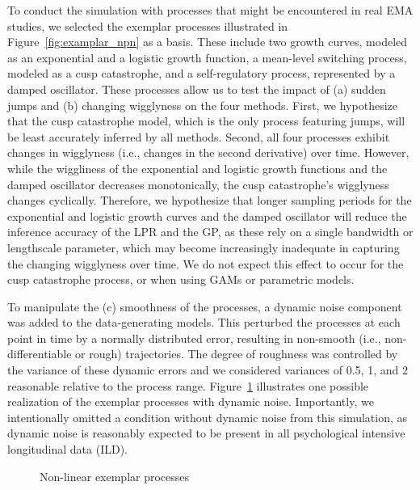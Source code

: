 \documentclass[man, floatsintext]{apa7}
\begin{document}
To conduct the simulation with processes that might be encountered in real
EMA studies, we selected the exemplar processes illustrated in
Figure~\ref{fig:examplar_npn} as a basis.
These include two growth curves, modeled as an exponential and
a logistic growth function, a mean-level switching process, modeled as a cusp
catastrophe, and a self-regulatory process, represented by a damped oscillator.
These processes allow us to test the impact of (a) sudden jumps and
(b) changing wigglyness on the four methods.
First, we hypothesize that the cusp catastrophe model, which is the only
process featuring jumps, will be least accurately inferred by all methods.
Second, all four processes exhibit changes in wigglyness (i.e., changes in the
second derivative) over time. However, while the wiggliness of the exponential
and logistic growth functions and the damped oscillator decreases
monotonically, the cusp catastrophe's wigglyness changes cyclically.
Therefore, we hypothesize that longer sampling periods for the exponential and
logistic
growth curves and the damped oscillator will reduce the inference accuracy of
the LPR and the GP, as these rely on a single bandwidth or lengthscale
parameter, which may become increasingly inadequate in capturing the changing
wigglyness over time. We do not expect this effect to occur for the cusp
catastrophe process, or when using GAMs or parametric models.

To manipulate the (c) smoothness of the processes, a dynamic noise
component was added to the data-generating models. This perturbed the
processes at each point in time by a normally distributed error,
resulting in non-smooth (i.e., non-differentiable or rough) trajectories.
The degree of roughness was controlled
by the variance of these dynamic errors and we considered variances of
0.5, 1, and 2 reasonable relative to the process range.
Figure~\ref{fig:exemplar_pn}
illustrates one possible realization of the exemplar processes with dynamic
noise. Importantly, we intentionally omitted a condition without dynamic noise
from this simulation, as dynamic noise is reasonably expected to be present in
all psychological intensive longitudinal data (ILD).

\begin{figure}[!ht]
  \caption{Non-linear exemplar processes}
  \label{fig:exemplar_pn}
\end{figure}
\end{document}
